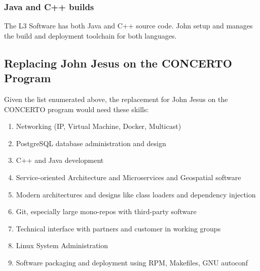 \documentclass[letterpaper,11pt]{texMemo} %
\begin{document}
\subsubsection*{Java and C++ builds}
The L3 Software has both Java and C++ source code.  John setup and manages the build and deployment toolchain for both languages.

\subsection*{Replacing John Jesus on the CONCERTO Program}
Given the list enumerated above, the replacement for John Jesus on the CONCERTO program would need these skills:

\begin{enumerate}
    \item Networking (IP, Virtual Machine, Docker, Multicast)
    \item PostgreSQL database administration and design
    \item C++ and Java development
    \item Service-oriented Architecture and Microservices and Geospatial software
    \item Modern architectures and designs like class loaders and dependency injection
    \item Git, especially large mono-repos with third-party software
    \item Technical interface with partners and customer in working groups
    \item Linux System Administration
    \item Software packaging and deployment using RPM, Makefiles, GNU autoconf
\end{enumerate}


\end{document}
